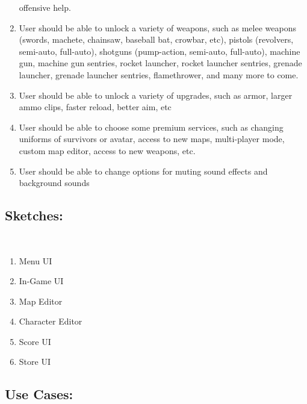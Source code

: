 \documentclass[oneside]{article}%
\begin{document}
\begin{enumerate}[*]
offensive help.
	\item User should be able to unlock a variety of weapons, such as melee weapons (swords,
machete, chainsaw, baseball bat, crowbar, etc), pistols (revolvers, semi-auto, full-auto),
shotguns (pump-action, semi-auto, full-auto), machine gun, machine gun sentries, rocket
launcher, rocket launcher sentries, grenade launcher, grenade launcher sentries, flamethrower,
and many more to come.
	\item User should be able to unlock a variety of upgrades, such as armor, larger ammo clips, faster
reload, better aim, etc
	\item User should be able to choose some premium services, such as changing uniforms of
survivors or avatar, access to new maps, multi-player mode, custom map editor, access to new
weapons, etc.
	\item User should be able to change options for muting sound effects and background sounds
\end{enumerate}

\subsection*{Sketches:}
\

\begin{enumerate}
	\item Menu UI
	\item In-Game UI
	\item Map Editor
	\item Character Editor
	\item Score UI
	\item Store UI
\end{enumerate}

\subsection*{Use Cases:}
\
\end{document}
